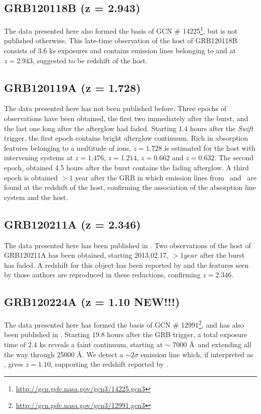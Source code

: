 \documentclass{aa}    %
\begin{document}
\subsection{GRB120118B (z = 2.943)}
The data presented here also formed the basis of GCN \#
14225\footnote{\url{http://gcn.gsfc.nasa.gov/gcn3/14225.gcn3}}, but is not
published otherwise. This late-time observation of the host of GRB120118B
consists of 3.6 ks exposures and contains emission lines belonging to \oii and
\oiii at $z =	2.943$, suggested to be redshift of the host.

\subsection{GRB120119A (z = 1.728)}
The data presented here has not been published before. Three epochs of
observations have been obtained, the first two immediately after the burst, and
the last one long after the afterglow had faded. Starting 1.4 hours after the
\textit{Swift} trigger, the first epoch contains bright afterglow continuum.
Rich in absorption features belonging to a multitude of ions, $z =	1.728$ is
estimated for the host with intervening systems at $z =	1.476$, $z = 1.214$, $z
= 0.662$ and $z = 0.632$. The second epoch, obtained 4.5 hours after the burst
contains the fading afterglow. A third epoch is obtained $>1$ year after the
GRB in which emission lines from \hb~and \ha~are found at the redshift of the
host, confirming the association of the absorption line system and the host.

\subsection{GRB120211A (z = 2.346)}
The data presented here has been published in \citet{Kruhler2015}. Two
observations of the host of GRB120211A has been obtained, starting 2013.02.17,
$> 1 year$ after the burst has faded. A redshift for this object has been
reported by \citet{Kruhler2015} and the features seen by those authors are
reproduced in these reductions, confirming $z =	2.346$.

\subsection{GRB120224A (z = 1.10 NEW!!!)}
The data presented here has formed the basis of GCN \#
12991\footnote{\url{http://gcn.gsfc.nasa.gov/gcn3/12991.gcn3}}, and has also
been published in \citet{Kruhler2015}. Starting 19.8 hours after the GRB
trigger, a total exposure time of 2.4 ks reveals a faint continuum, starting at
$\sim$ 7000 \AA~and extending all the way through 25000 \AA. We detect a $\sim
2 \sigma$ emission line which, if interpreted as \ha, gives $z = 1.10$,
supporting the redshift reported by \citet{Kruhler2015}.
\end{document}
